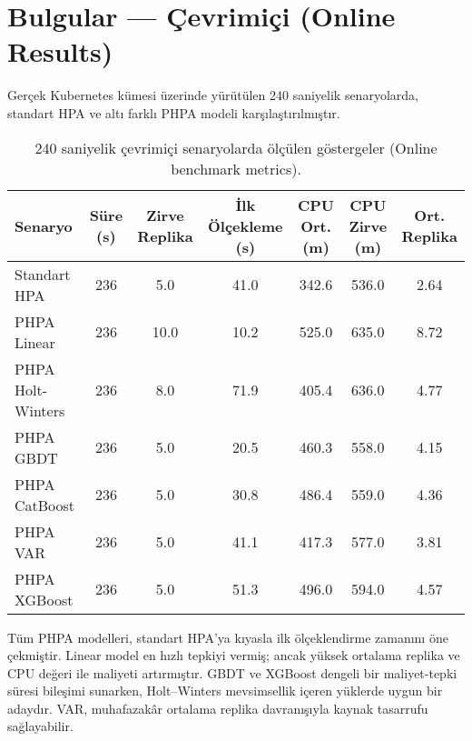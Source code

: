 \section{Bulgular — Çevrimiçi (Online Results)}

Gerçek Kubernetes kümesi üzerinde yürütülen 240 saniyelik senaryolarda, standart HPA ve altı farklı PHPA modeli karşılaştırılmıştır.

\begin{table}[h]
    \centering
    \caption{240 saniyelik çevrimiçi senaryolarda ölçülen göstergeler (Online benchmark metrics).}
    \label{tab:online}
    \begin{tabular}{@{}lcccccc@{}}
        \toprule
        Senaryo & Süre (s) & Zirve Replika & İlk Ölçekleme (s) & CPU Ort. (m) & CPU Zirve (m) & Ort. Replika \\
        \midrule
        Standart HPA & 236 & 5.0 & 41.0 & 342.6 & 536.0 & 2.64 \\
        PHPA Linear & 236 & 10.0 & 10.2 & 525.0 & 635.0 & 8.72 \\
        PHPA Holt-Winters & 236 & 8.0 & 71.9 & 405.4 & 636.0 & 4.77 \\
        PHPA GBDT & 236 & 5.0 & 20.5 & 460.3 & 558.0 & 4.15 \\
        PHPA CatBoost & 236 & 5.0 & 30.8 & 486.4 & 559.0 & 4.36 \\
        PHPA VAR & 236 & 5.0 & 41.1 & 417.3 & 577.0 & 3.81 \\
        PHPA XGBoost & 236 & 5.0 & 51.3 & 496.0 & 594.0 & 4.57 \\
        \bottomrule
    \end{tabular}
\end{table}

Tüm PHPA modelleri, standart HPA'ya kıyasla ilk ölçeklendirme zamanını öne çekmiştir. Linear model en hızlı tepkiyi vermiş; ancak yüksek ortalama replika ve CPU değeri ile maliyeti artırmıştır. GBDT ve XGBoost dengeli bir maliyet-tepki süresi bileşimi sunarken, Holt–Winters mevsimsellik içeren yüklerde uygun bir adaydır. VAR, muhafazakâr ortalama replika davranışıyla kaynak tasarrufu sağlayabilir.

